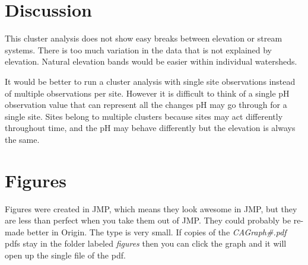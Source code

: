 \section{Discussion}

This cluster analysis does not show easy breaks between elevation or stream systems.  There is too much variation in the data that is not explained by elevation. Natural elevation bands would be easier within individual watersheds.

It would be better to run a cluster analysis with single site observations instead of multiple observations per site.  However it is difficult to think of a single pH observation value that can represent all the changes pH may go through for a single site.  Sites belong to multiple clusters because sites may act differently throughout time, and the pH may behave differently but the elevation is always the same.
\pagebreak

\section{Figures}
Figures were created in JMP, which means they look awesome in JMP, but they are less than perfect when you take them out of JMP.  They could probably be re-made better in Origin.
The type is very small.  If copies of the {\it CAGraph\#.pdf}  pdfs stay in the folder labeled {\it figures}  then you can click the graph and it will open up the single file of the pdf.
\pagebreak

\label{CAGraph1}


\label{CAGraph2}


\label{CAGraph3}


\label{CAGraph6}


\label{CAGraph8}


\label{CAGraph9}


\label{CAGraph10}





















